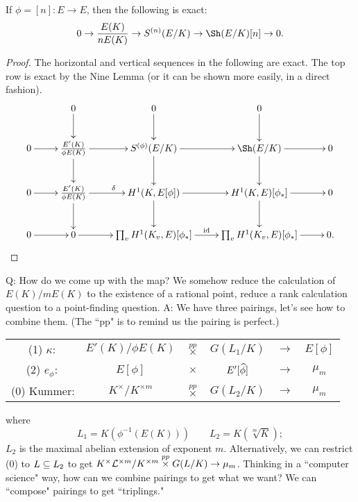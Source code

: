 \begin{thm}
If $\phi=[n]:E\to E$, then the following is exact:
\[
0\to \fc{E(K)}{nE(K)}\to S^{(n)}(E/K) \to \Sh (E/K)[n]\to 0.
\]
\end{thm}
\begin{proof}
The horizontal and vertical sequences in the following are exact. The top row is exact by the Nine Lemma (or it can be shown more easily, in a direct fashion).
\[
\xymatrix{
&0\ar[d]&0\ar[d] & 0\ar[d] &\\
0\ar[r]& \fc{E'(K)}{\phi E(K)} \ar[r]\ar[d] & S^{(\phi)}(E/K) \ar[d]\ar[r] & \Sh(E/K)\ar[d]\ar[r]&0\\
0\ar[r] & \fc{E'(K)}{\phi E(K)} \ar[r]^{\de} \ar[d]& H^1(K,E[\phi]) \ar[r]\ar[d] & H^1(K,E)[\phi_*]\ar[r]\ar[d] & 0\\
0\ar[r] & 0\ar[r] & \prod_v H^1(K_v,E)[\phi_*] \ar[r]^{\id} & \prod_v H^1(K_v,E)[\phi_*]\ar[r] & 0.
}
\]
\end{proof}
Q: How do we come up with the map? We somehow reduce the calculation of $E(K)/mE(K)$ to the existence of a rational point, reduce a rank calculation question to a point-finding question. 
A: We have three pairings, let's see how to combine them. (The ``pp" is to remind us the pairing is perfect.)

\begin{center}
\begin{tabular}{cccccc}
(1) $\kappa:$ & $E'(K)/\phi E(K)$ & $\stackrel{pp}{\times}$ & $G(L_1/K)$ & $\to$ & $E[\phi]$\tabularnewline
(2) $e_{\phi}:$ & $E[\phi]$ & $\times$ & $E'[\wh{\phi}]$ & $\to$ & $\mu_{m}$\tabularnewline
(0) Kummer: & $K^{\times}/K^{\times m}$ & $\stackrel{pp}{\times}$ & $G(L_2/K)$ & $\to$ & $\mu_{m}$\tabularnewline
\end{tabular}
\end{center}
where 
\[
L_1=K(\phi^{-1}(E(K)))\qquad L_2=K(\sqrt[m]{K});
\]
$L_2$ is the maximal abelian extension of exponent $m$. 
Alternatively, we can restrict (0) to $L\subeq L_2$ to get $K^{\times}\cal L^{\times m}/K^{\times m}\stackrel{pp}{\times} G(L/K)\to \mu_m$. 
Thinking in a ``computer science" way, how can we combine pairings to get what we want? We can ``compose" pairings to get ``triplings."

